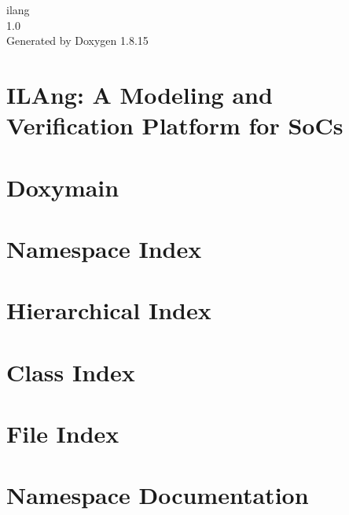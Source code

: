 \documentclass[twoside]{book}
\newcommand{\+}{\discretionary{\mbox{\scriptsize$\hookleftarrow$}}{}{}}
\newcommand{\clearemptydoublepage}{%
  \newpage{\pagestyle{empty}\cleardoublepage}%
}
\begin{document}
\hypersetup{pageanchor=false,
             bookmarksnumbered=true,
             pdfencoding=unicode
            }
\begin{titlepage}
\vspace*{7cm}
\begin{center}%
{\Large ilang \\[1ex]\large 1.\+0 }\\
\vspace*{1cm}
{\large Generated by Doxygen 1.8.15}\\
\end{center}
\end{titlepage}
\clearemptydoublepage
{}
\tableofcontents
\clearemptydoublepage
{}
\hypersetup{pageanchor=true}

\chapter{I\+L\+Ang\+: A Modeling and Verification Platform for So\+Cs}
\label{index}\hypertarget{index}{}
\chapter{Doxymain}
\label{md__home_byhuang__i_l_a-_tools_docs__doxymain}

\chapter{Namespace Index}

\chapter{Hierarchical Index}

\chapter{Class Index}

\chapter{File Index}

\chapter{Namespace Documentation}


\end{document}

